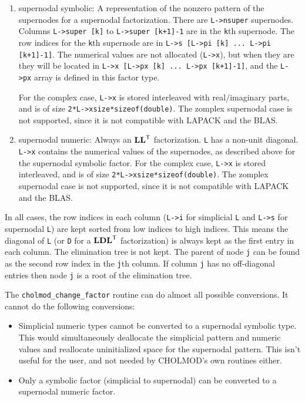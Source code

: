 \documentclass[11pt]{article}
\newcommand{\m}[1]{{\bf{#1}}}       %
\newcommand{\tr}{^{\sf T}}          %
\begin{document}
\begin{enumerate}
\item supernodal symbolic:  A representation of the nonzero pattern of the
supernodes for a supernodal factorization.  There are {\tt L->nsuper}
supernodes.  Columns {\tt L->super [k]} to {\tt L->super [k+1]-1} are in the {\tt k}th
supernode.  The row indices for the {\tt k}th supernode are in
{\tt L->s [L->pi [k] ... L->pi [k+1]-1]}.  The numerical values are not
allocated ({\tt L->x}), but when they are they will be located in
{\tt L->x [L->px [k] ... L->px [k+1]-1]}, and the {\tt L->px} array is defined
in this factor type.

For the complex case, {\tt L->x} is stored interleaved with real/imaginary parts,
and is of size \newline
{\tt 2*L->xsize*sizeof(double)}.  The zomplex supernodal case
is not supported, since it is not compatible with LAPACK and the BLAS.

\item supernodal numeric:  Always an $\m{LL}\tr$ factorization.  {\tt L} has a non-unit
     diagonal.  {\tt L->x} contains the numerical values of the supernodes, as
     described above for the supernodal symbolic factor.
     For the complex case, {\tt L->x} is stored interleaved, and is of size
     {\tt 2*L->xsize*sizeof(double)}.  The zomplex supernodal case is not
     supported, since it is not compatible with LAPACK and the BLAS.
\end{enumerate}


In all cases, the row indices in each column ({\tt L->i} for simplicial {\tt L} and
{\tt L->s} for supernodal {\tt L}) are kept sorted from low indices to high indices.
This means the diagonal of {\tt L} (or {\tt D} for a $\m{LDL}\tr$ factorization) is always kept as the
first entry in each column.  The elimination tree is not kept.  The parent
of node {\tt j} can be found as the second row index in the {\tt j}th column.
If column {\tt j} has no off-diagonal entries then node {\tt j} is a root
of the elimination tree.

The {\tt cholmod\_change\_factor} routine can do almost all possible conversions.
It cannot do the following conversions:

\begin{itemize}
\item Simplicial numeric types cannot be converted to a supernodal
    symbolic type.  This would simultaneously deallocate the
    simplicial pattern and numeric values and reallocate uninitialized
    space for the supernodal pattern.  This isn't useful for the user,
    and not needed by CHOLMOD's own routines either.
\item Only a symbolic factor (simplicial to supernodal) can be converted
    to a supernodal numeric factor.
\end{itemize}
\end{document}
